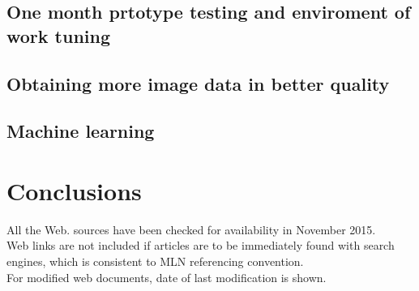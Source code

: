 \documentclass[12pt,twoside,a4paper]{article}
\begin{document}
\subsection{One month prtotype testing and enviroment of work tuning}
\subsection{Obtaining more image data in better quality}
\subsection{Machine learning}

\section{Conclusions}






All the Web. sources have been checked for availability in November 2015.\\
Web links are not included if articles are to be immediately found with search engines, which is consistent to MLN referencing convention.\\
For modified web documents, date of last modification is shown.
\end{document}
